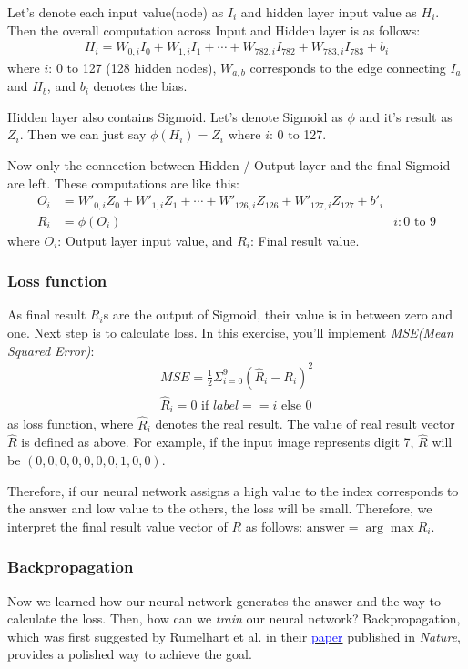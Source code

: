 \documentclass{oblivoir}
\begin{document}
Let's denote each input value(node) as $I_i$ and hidden layer input value as $H_i$. Then the overall computation across Input and Hidden layer is as follows:
\begin{align*}
    H_i = W_{0, i}I_0 + W_{1, i}I_1 + \cdots + W_{782, i}I_{782} + W_{783, i}I_{783} + b_i
\end{align*}
where $i$: 0 to 127 (128 hidden nodes), $W_{a,b}$ corresponds to the edge connecting $I_a$ and $H_b$, and $b_i$ denotes the bias. 

Hidden layer also contains Sigmoid. Let's denote Sigmoid as $\phi$ and it's result as $Z_i$. Then we can just say $\phi(H_i) = Z_i$ where $i$: 0 to 127.

Now only the connection between Hidden / Output layer and the final Sigmoid are left. These computations are like this:
\begin{align*}
    O_i &= W'_{0, i}Z_0 + W'_{1, i}Z_1 + \cdots + W'_{126, i}Z_{126} + W'_{127, i}Z_{127} + b'_i & \\
    R_i &= \phi(O_i) & i: 0 \text{ to } 9
\end{align*}
where $O_i$: Output layer input value, and $R_i$: Final result value.


\subsubsection{Loss function}

As final result $R_i$s are the output of Sigmoid, their value is in between zero and one. Next step is to calculate loss. In this exercise, you'll implement \textit{MSE(Mean Squared Error)}:
\begin{align*}
    MSE = \frac{1}{2}\Sigma_{i=0}^{9}(\hat{R}_i - R_i)^2 \\
    \hat{R}_i = 0 \text{ if } label == i \text{ else } 0 
\end{align*}
as loss function, where $\hat{R}_i$ denotes the real result. The value of real result vector $\hat{R}$ is defined as above. For example, if the input image represents digit 7, $\hat{R}$ will be $(0,0,0,0,0,0,0,1,0,0)$.

Therefore, if our neural network assigns a high value to the index corresponds to the answer and low value to the others, the loss will be small. Therefore, we interpret the final result value vector of $R$ as follows: $\text{answer} = \arg\max R_i$.
\subsubsection{Backpropagation}
Now we learned how our neural network generates the answer and the way to calculate the loss. Then, how can we \textit{train} our neural network? Backpropagation, which was first suggested by Rumelhart et al. in their \href{https://www.iro.umontreal.ca/~vincentp/ift3395/lectures/backprop_old.pdf}{\textcolor{blue}{paper}} published in \textit{Nature}, provides a polished way to achieve the goal. 
\end{document}

